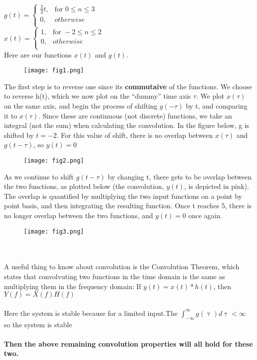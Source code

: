 \documentclass[journal,12pt,twocolumn]{IEEEtran}
\begin{document}
$g(t)=
\begin{cases}
      \frac{2}{3}t , & \text{for } 0 \leq n \leq 3 \\
    0, & otherwise\\
\end{cases}$\\
$x(t)=
 \begin{cases}
    1, & \text{for } -2 \leq n \leq 2 \\
    0, & otherwise\\
  \end{cases}$\\
  Here are our functions $x(t)$ and $g(t)$. 
  \begin{figure}[htp]
      \centering
      \texttt{[image: fig1.png]}
      \label{fig:my_label}
  \end{figure}
 The first step is to reverse one since its \textbf{commutaive} of the functions. We choose to reverse h(t), which
we now plot on the “dummy” time axis $\tau$.
 We plot $x(\tau)$ on the same axis, and begin the process of shifting $g(-\tau)$ by t, and
comparing it to $x(\tau)$. Since these are continuous (not discrete) functions, we take an
integral (not the sum) when calculating the convolution. In the figure below, g is shifted
by $t=-2$. For this value of shift, there is no overlap between $x(\tau)$ and $g(t-\tau)$, so $y(t)=0 $
   \begin{figure}[htp]
      \centering
      \texttt{[image: fig2.png]}
      \label{fig:my_label}
  \end{figure}
  As we continue to shift $g(t-\tau)$ by changing t, there gets to be overlap between the
two functions, as plotted below (the convolution, $y(t)$, is depicted in pink). The overlap is
quantified by multiplying the two input functions on a point by point basis, and then
integrating the resulting function. 
 Once t reaches 5, there is no longer overlap between the two functions, and $y(t)=0$
once again. 
   \begin{figure}[htp]
      \centering
      \texttt{[image: fig3.png]}
      \label{fig:my_label}
  \end{figure}\\\\
  A useful thing to know about convolution is the Convolution Theorem, which states that convolvuting two functions in the time domain is the same as multiplying them in the frequency domain:
 If $y(t)=x(t)*h(t)$,  then $Y(f)=X(f)H(f)$ \\\\
 Here the system is stable because for a limited input.The  $\int_{-\infty}^{\infty} g(\uptau)d\uptau < \infty$ so the system is stable
  \\\\\textbf{Then the above remaining convolution properties will all hold for these two.}
\end{document}
